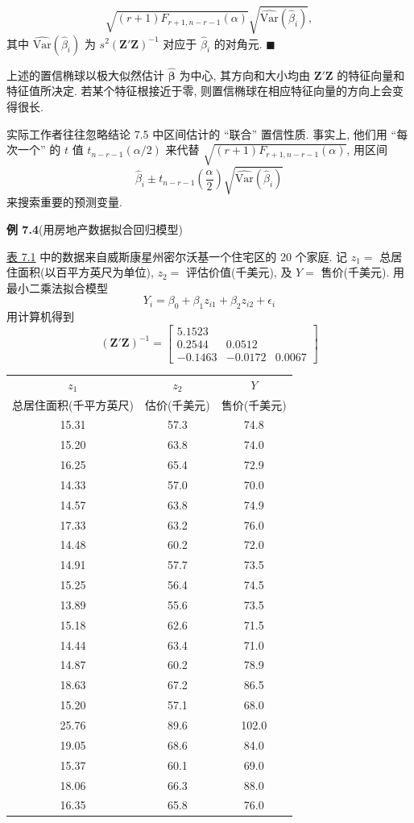 
\[
\sqrt{(r+1)F_{r+1,n-r-1}(\alpha)}\sqrt{\widehat{\text{Var}}(\hat{\beta}_i)},
\]
其中 $\widehat{\text{Var}}(\hat{\beta}_i)$ 为 $s^2(\mathbf{Z}'\mathbf{Z})^{-1}$ 对应于 $\hat{\beta}_i$ 的对角元. \hfill$\blacksquare$

上述的置信椭球以极大似然估计 $\hat{\boldsymbol{\beta}}$ 为中心, 其方向和大小均由 $\mathbf{Z}'\mathbf{Z}$ 的特征向量和特征值所决定. 若某个特征根接近于零, 则置信椭球在相应特征向量的方向上会变得很长.

实际工作者往往忽略结论 7.5 中区间估计的 ``联合'' 置信性质. 事实上, 他们用 ``每次一个'' 的 $t$ 值 $t_{n-r-1}(\alpha/2)$ 来代替 $\sqrt{(r+1)F_{r+1,n-r-1}(\alpha)}$, 用区间
\label{eq:7-11}
\begin{equation}
\hat{\beta}_i\pm t_{n-r-1}\left(\frac{\alpha}{2}\right)\sqrt{\widehat{\text{Var}}(\hat{\beta}_i)}
\tag{7-11}
\end{equation}
来搜索重要的预测变量.

\medskip
\noindent\textbf{例 7.4}\quad (用房地产数据拟合回归模型)

\hyperref[tab:7.1]{表 7.1} 中的数据来自威斯康星州密尔沃基一个住宅区的 20 个家庭. 记 $z_1=$ 总居住面积(以百平方英尺为单位), $z_2=$ 评估价值(千美元), 及 $Y=$ 售价(千美元). 用最小二乘法拟合模型
\[
Y_i=\beta_0+\beta_1 z_{i1}+\beta_2 z_{i2}+\epsilon_i
\]
用计算机得到
\[
(\mathbf{Z}'\mathbf{Z})^{-1}=\begin{bmatrix}
5.1523&&\\
0.2544&0.0512&\\
-0.1463&-0.0172&0.0067
\end{bmatrix}
\]

\begin{mvtable}
\label{tab:7.1}
\begin{tabular}{ccc}
\hline
$z_1$&$z_2$&$Y$\\
总居住面积(千平方英尺)&估价(千美元)&售价(千美元)\\
\hline
15.31&57.3&74.8\\
15.20&63.8&74.0\\
16.25&65.4&72.9\\
14.33&57.0&70.0\\
14.57&63.8&74.9\\
17.33&63.2&76.0\\
14.48&60.2&72.0\\
14.91&57.7&73.5\\
15.25&56.4&74.5\\
13.89&55.6&73.5\\
15.18&62.6&71.5\\
14.44&63.4&71.0\\
14.87&60.2&78.9\\
18.63&67.2&86.5\\
15.20&57.1&68.0\\
25.76&89.6&102.0\\
19.05&68.6&84.0\\
15.37&60.1&69.0\\
18.06&66.3&88.0\\
16.35&65.8&76.0\\
\hline
\end{tabular}
\end{mvtable}
